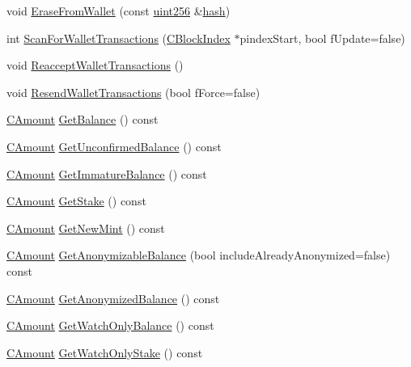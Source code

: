 \begin{DoxyCompactItemize}
\item 
void \hyperlink{class_c_wallet_a43dc1cf73c622cca29e530130e648470}{Erase\+From\+Wallet} (const \hyperlink{classuint256}{uint256} \&\hyperlink{cache_8cc_a11ecb029164e055f28f4123ce3748862}{hash})
\item 
int \hyperlink{class_c_wallet_a979a17e80e4897ed1f4ae9a4be7c493c}{Scan\+For\+Wallet\+Transactions} (\hyperlink{class_c_block_index}{C\+Block\+Index} $\ast$pindex\+Start, bool f\+Update=false)
\item 
void \hyperlink{class_c_wallet_a796c23450c8482e10e0c75ae5c1fa8ed}{Reaccept\+Wallet\+Transactions} ()
\item 
void \hyperlink{class_c_wallet_ace33dcf23623d2036a38696bc3a94553}{Resend\+Wallet\+Transactions} (bool f\+Force=false)
\item 
\hyperlink{amount_8h_a4eaf3a5239714d8c45b851527f7cb564}{C\+Amount} \hyperlink{class_c_wallet_afb8dee3ffdf2bc5e7499b10bb65efdaf}{Get\+Balance} () const 
\item 
\hyperlink{amount_8h_a4eaf3a5239714d8c45b851527f7cb564}{C\+Amount} \hyperlink{class_c_wallet_a7dbe4899ff7d8562376d803b02481228}{Get\+Unconfirmed\+Balance} () const 
\item 
\hyperlink{amount_8h_a4eaf3a5239714d8c45b851527f7cb564}{C\+Amount} \hyperlink{class_c_wallet_ad91469884e16fc85665f27e29161ee34}{Get\+Immature\+Balance} () const 
\item 
\hyperlink{amount_8h_a4eaf3a5239714d8c45b851527f7cb564}{C\+Amount} \hyperlink{class_c_wallet_a07a9f015e0272a9de79fb34311086b84}{Get\+Stake} () const 
\item 
\hyperlink{amount_8h_a4eaf3a5239714d8c45b851527f7cb564}{C\+Amount} \hyperlink{class_c_wallet_aa614dc28d5940048c6d5b672ca5d8a22}{Get\+New\+Mint} () const 
\item 
\hyperlink{amount_8h_a4eaf3a5239714d8c45b851527f7cb564}{C\+Amount} \hyperlink{class_c_wallet_a842f8ca0ec3e6879c7f95f1420c7932f}{Get\+Anonymizable\+Balance} (bool include\+Already\+Anonymized=false) const 
\item 
\hyperlink{amount_8h_a4eaf3a5239714d8c45b851527f7cb564}{C\+Amount} \hyperlink{class_c_wallet_af5b8987016e90d66fe1d3a475dfe03b4}{Get\+Anonymized\+Balance} () const 
\item 
\hyperlink{amount_8h_a4eaf3a5239714d8c45b851527f7cb564}{C\+Amount} \hyperlink{class_c_wallet_a4e1047525a8f418485ce3a84057265d3}{Get\+Watch\+Only\+Balance} () const 
\item 
\hyperlink{amount_8h_a4eaf3a5239714d8c45b851527f7cb564}{C\+Amount} \hyperlink{class_c_wallet_a63579a8e709da9ffe6bb9e1fa7de7ce3}{Get\+Watch\+Only\+Stake} () const 

\end{DoxyCompactItemize}

